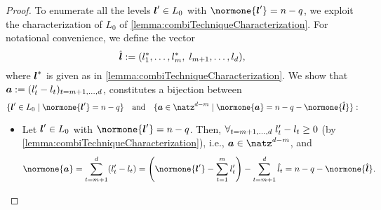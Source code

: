 \begin{proof}
  To enumerate all the levels ${\boldsymbol{l}}' \in L_0$ with $\normone{\*l'} = n - q$,
  we exploit the characterization of $L_0$ of
  \cref{lemma:combiTechniqueCharacterization}.
  For notational convenience, we define the vector
  \begin{equation}
    \hat{{\boldsymbol{l}}}
    := (l^\ast_1, \dotsc, l^\ast_m,\; l_{m+1}, \dotsc, l_d),
  \end{equation}
  where ${\boldsymbol{l}}^\ast$ is given as in \cref{lemma:combiTechniqueCharacterization}.
  We show that ${\boldsymbol{a}} := (l'_t - l_t)_{t = m+1, \dotsc, d}$,
  constitutes a bijection between
  \begin{equation}
    \{\*l' \in L_0 \mid \normone{\*l'} = n - q\}
    \quad\text{and}\quad
    \{\*a \in \natz^{d-m} \mid \normone{\*a} = n - q - \normone{\hat{\*l}}\}:
  \end{equation}
  \begin{itemize}
    \item
    Let ${\boldsymbol{l}}' \in L_0$ with $\normone{\*l'} = n - q$.
    Then, $\forall_{t=m+1,\dotsc,d}\;l'_t - l_t \ge 0$
    (by \cref{lemma:combiTechniqueCharacterization}), i.e.,
    $\*a \in \natz^{d-m}$, and
    \begin{equation}
      \normone{\*a}
      = \sum_{t=m+1}^d (l'_t - l_t)
      = \paren*{\normone{\*l'} - \sum_{t=1}^m l'_t} -
      \sum_{t=m+1}^d \hat{l}_t
      = n - q - \normone{\hat{\*l}}.
    \end{equation}
    

\end{itemize}
\end{proof}
